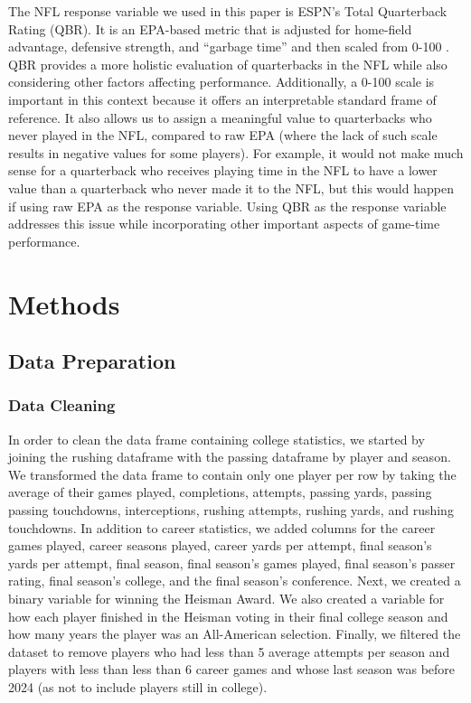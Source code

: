\documentclass{article}
\begin{document}
The NFL response variable we used in this paper is ESPN's Total Quarterback Rating (QBR). It is an EPA-based metric that is adjusted for home-field advantage, defensive strength, and ``garbage time'' and then scaled from 0-100 \citep{noauthor_how_2016}. QBR provides a more holistic evaluation of quarterbacks in the NFL while also considering other factors affecting performance. Additionally, a 0-100 scale is important in this context because it offers an interpretable standard frame of reference. It also allows us to assign a meaningful value to quarterbacks who never played in the NFL, compared to raw EPA (where the lack of such scale results in negative values for some players). For example, it would not make much sense for a quarterback who receives playing time in the NFL to have a lower value than a quarterback who never made it to the NFL, but this would happen if using raw EPA as the response variable. Using QBR as the response variable addresses this issue while incorporating other important aspects of game-time performance.

\section{Methods}

\subsection{Data Preparation}

\subsubsection{Data Cleaning}

In order to clean the data frame containing college statistics, we started by joining the rushing dataframe with the passing dataframe by player and season. We transformed the data frame to contain only one player per row by taking the average of their games played, completions, attempts, passing yards, passing passing touchdowns, interceptions, rushing attempts, rushing yards, and rushing touchdowns. In addition to career statistics, we added columns for the career games played, career seasons played, career yards per attempt, final season's yards per attempt, final season, final season's games played, final season's passer rating, final season's college, and the final season's conference.  Next, we created a binary variable for winning the Heisman Award. We also created a variable for how each player finished in the Heisman voting in their final college season and how many years the player was an All-American selection. Finally, we filtered the dataset to remove players who had less than 5 average attempts per season and players with less than less than 6 career games and whose last season was before 2024 (as not to include players still in college).
\end{document}
